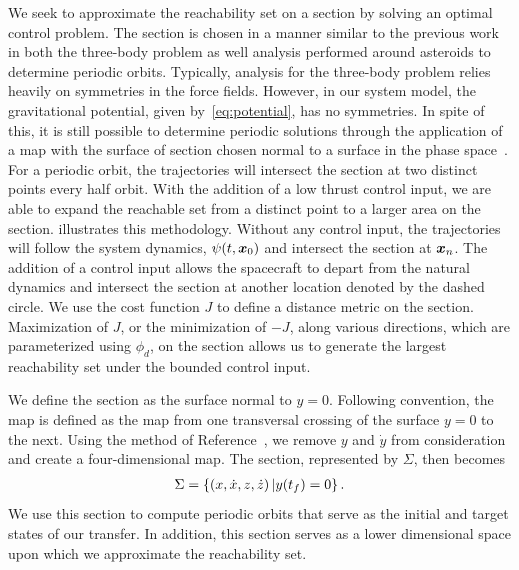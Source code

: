 \documentclass[]{aiaa-tc}%
\begin{document}
We seek to approximate the reachability set on a \Poincare section by solving an optimal control problem.
The \Poincare section is chosen in a manner similar to the previous work in both the three-body problem as well analysis performed around asteroids to determine periodic orbits.
Typically, analysis for the three-body problem relies heavily on symmetries in the force fields.
However, in our system model, the gravitational potential, given by~\cref{eq:potential}, has no symmetries.
In spite of this, it is still possible to determine periodic solutions through the application of a \Poincare map with the surface of section chosen normal to a surface in the phase space~\cite{scheeres2000}.
For a periodic orbit, the trajectories will intersect the \Poincare section at two distinct points every half orbit.
With the addition of a low thrust control input, we are able to expand the reachable set from a distinct point to a larger area on the \Poincare section.
 illustrates this methodology.
Without any control input, the trajectories will follow the system dynamics, \( \psi(t, \bm{x}_0 ) \) and intersect the \Poincare section at \( \bm{x}_n\).
The addition of a control input allows the spacecraft to depart from the natural dynamics and intersect the section at another location denoted by the dashed circle.
We use the cost function \( J \) to define a distance metric on the \Poincare section.
Maximization of \( J \), or the minimization of \( -J \), along various directions, which are parameterized using \( \phi_d \), on the \Poincare section allows us to generate the largest reachability set under the bounded control input.

We define the \Poincare section as the surface normal to \( y = 0 \).
Following convention, the \Poincare map is defined as the map from one transversal crossing of the surface \( y = 0\) to the next.
Using the method of Reference~, we remove \( y \) and \( \dot{y} \) from consideration and create a four-dimensional map.
The \Poincare section, represented by \( \Sigma \), then becomes
\begin{align}\label{eq:poincare_section}
    \Sigma = \left\{ \left( x, \dot{x}, z, \dot{z} \right) | y(t_f) = 0  \right\}.
\end{align}
We use this section to compute periodic orbits that serve as the initial and target states of our transfer.
In addition, this section serves as a lower dimensional space upon which we approximate the reachability set.
\end{document}
